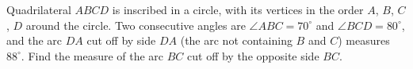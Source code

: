 Quadrilateral $ABCD$ is inscribed in a circle, with its vertices in the order $A$, $B$, $C$, $D$ around the circle. Two consecutive angles are $\angle ABC=70^\circ$ and $\angle BCD=80^\circ$, and the arc $DA$ cut off by side $DA$ (the arc not containing $B$ and $C$) measures $88^\circ$. Find the measure of the arc $BC$ cut off by the opposite side $BC$.
